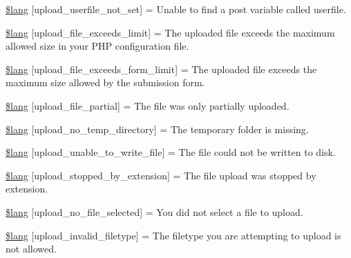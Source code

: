\begin{DoxyCompactItemize}
\item 
\mbox{\hyperlink{upload__lang_8php_aa4b26b58d6f43453951a13be6cc0b518}{\$lang}} \mbox{[}\textquotesingle{}upload\+\_\+userfile\+\_\+not\+\_\+set\textquotesingle{}\mbox{]} = \textquotesingle{}Unable to find a post variable called userfile.\textquotesingle{}
\item 
\mbox{\hyperlink{upload__lang_8php_a1fa00774a04d9212897c67dacfd7d357}{\$lang}} \mbox{[}\textquotesingle{}upload\+\_\+file\+\_\+exceeds\+\_\+limit\textquotesingle{}\mbox{]} = \textquotesingle{}The uploaded file exceeds the maximum allowed size in your P\+HP configuration file.\textquotesingle{}
\item 
\mbox{\hyperlink{upload__lang_8php_ad1f12e7d79f589d5571b5d1e1ffb0ebf}{\$lang}} \mbox{[}\textquotesingle{}upload\+\_\+file\+\_\+exceeds\+\_\+form\+\_\+limit\textquotesingle{}\mbox{]} = \textquotesingle{}The uploaded file exceeds the maximum size allowed by the submission form.\textquotesingle{}
\item 
\mbox{\hyperlink{upload__lang_8php_ab5ced9ba25c0822e3dc6df6b1b5ba57d}{\$lang}} \mbox{[}\textquotesingle{}upload\+\_\+file\+\_\+partial\textquotesingle{}\mbox{]} = \textquotesingle{}The file was only partially uploaded.\textquotesingle{}
\item 
\mbox{\hyperlink{upload__lang_8php_a6b79b72c7a23fcb8eaced898a3d0c094}{\$lang}} \mbox{[}\textquotesingle{}upload\+\_\+no\+\_\+temp\+\_\+directory\textquotesingle{}\mbox{]} = \textquotesingle{}The temporary folder is missing.\textquotesingle{}
\item 
\mbox{\hyperlink{upload__lang_8php_a6c5d5a8fccba5fe8ab4ef79a8f5784ea}{\$lang}} \mbox{[}\textquotesingle{}upload\+\_\+unable\+\_\+to\+\_\+write\+\_\+file\textquotesingle{}\mbox{]} = \textquotesingle{}The file could not be written to disk.\textquotesingle{}
\item 
\mbox{\hyperlink{upload__lang_8php_ad57b06060cd2ab19de69ffe6e961dad7}{\$lang}} \mbox{[}\textquotesingle{}upload\+\_\+stopped\+\_\+by\+\_\+extension\textquotesingle{}\mbox{]} = \textquotesingle{}The file upload was stopped by extension.\textquotesingle{}
\item 
\mbox{\hyperlink{upload__lang_8php_a2b5f23816ba933cb68c32a89206bde46}{\$lang}} \mbox{[}\textquotesingle{}upload\+\_\+no\+\_\+file\+\_\+selected\textquotesingle{}\mbox{]} = \textquotesingle{}You did not select a file to upload.\textquotesingle{}
\item 
\mbox{\hyperlink{upload__lang_8php_a98bf1d1aac6eb034547936e070ff7e0a}{\$lang}} \mbox{[}\textquotesingle{}upload\+\_\+invalid\+\_\+filetype\textquotesingle{}\mbox{]} = \textquotesingle{}The filetype you are attempting to upload is not allowed.\textquotesingle{}

\end{DoxyCompactItemize}
